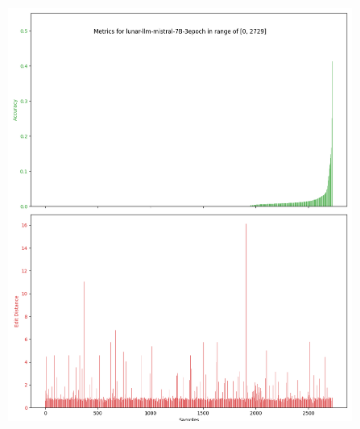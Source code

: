 \begin{figure}[ht]
\begin{subfigure}{0.5\textwidth}
	\end{subfigure}
 	\begin{subfigure}{0.5\textwidth}
		\includegraphics[width=1.0\textwidth]{Immagini/evaluations/lunar-llm-mistral-7B-3epoch_metrics.png}
	\end{subfigure}%
 	\begin{subfigure}{0.5\textwidth}

\end{subfigure}
\end{figure}
